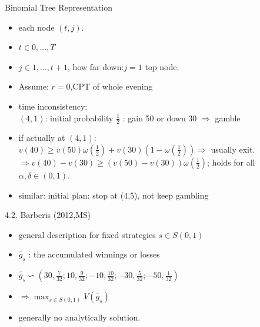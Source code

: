 \documentclass[11pt, aspectratio=169]{beamer}
\begin{document}
\begin{frame}{Binomial Tree Representation}
    \begin{itemize}
        \item each node $(t, j)$.  \medskip
        \item $t \in {0,\ldots ,T}$ \medskip
        \item $ j \in {1,\ldots, t+1}$, how far down:$j=1$ top node.\medskip
        \item Assume: $r=0$,CPT of whole evening
        \item  time inconsistency:\\
        $(4,1)$: initial probability $\frac{1}{2}$ : gain 50 or down 30  $\Rightarrow$ gamble\\
        \item if actually at $(4,1)$:\\
        $v(40) \geq v(50)\omega (\frac{1}{2})+v(30)(1-\omega (\frac{1}{2})) \Rightarrow$ usually exit. \\
        $\Rightarrow v(40)-v(30) \geq (v(50)-v(30))\omega (\frac{1}{2})   $;  holds for all $\alpha, \delta \in (0,1)$.\\
        \item similar: initial plan: stop at (4,5), not keep gambling\\
    \end{itemize}
\end{frame}

\begin{frame}{4.2. Barberis (2012,MS)}
    \begin{itemize}
        \item general description for fixed strategies $s \in S(0,1)$\\
        \item $\tilde{g_s} $ : the accumulated winnings or losses\\
        \item $\tilde{g_s} \backsim (30,\frac{7}{32};10,\frac{9}{32};-10,\frac{10}{32};-30,\frac{5}{32};-50,\frac{1}{32} )  $\\
        \item $\Rightarrow \max_{s \in S(0,1)} V(\tilde{g_s})$\\
        \item generally no analytically solution.\\
    \end{itemize}
\end{frame}
\end{document}
